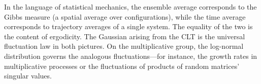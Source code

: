 \begin{remark}\label{rmk:statmech}
In the language of statistical mechanics, the ensemble average corresponds to the Gibbs measure (a spatial average over configurations), while the time average corresponds to trajectory averages of a single system. The equality of the two is the content of ergodicity. The Gaussian arising from the CLT is the universal fluctuation law in both pictures. On the multiplicative group, the log-normal distribution governs the analogous fluctuations---for instance, the growth rates in multiplicative processes or the fluctuations of products of random matrices' singular values.
\end{remark}

